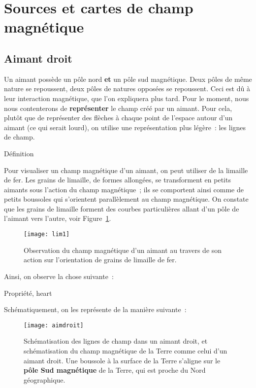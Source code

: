 \documentclass[../main/main.tex]{subfiles}
\begin{document}
\section{Sources et cartes de champ magnétique}
\subsection{Aimant droit}
\label{ssec:aimdroit}
Un aimant possède un pôle nord \textbf{et} un pôle sud magnétique. Deux pôles de
même nature se repoussent, deux pôles de natures opposées se repoussent. Ceci
est dû à leur interaction magnétique, que l'on expliquera plus tard. Pour le
moment, nous nous contenterons de \textbf{représenter} le champ créé par un
aimant. Pour cela, plutôt que de représenter des flèches à chaque point de
l'espace autour d'un aimant (ce qui serait lourd), on utilise une représentation
plus légère~: les lignes de champ.
\begin{tdefi}{Définition}
\end{tdefi}

Pour visualiser un champ magnétique d'un aimant, on peut utiliser de la limaille
de fer. Les grains de limaille, de formes allongées, se transforment en petits
aimants sous l'action du champ magnétique~; ils se comportent ainsi comme de
petits boussoles qui s'orientent parallèlement au champ magnétique. On constate
que les grains de limaille forment des courbes particulières allant d'un pôle de
l'aimant vers l'autre, voir Figure~\ref{fig:lim1}.
\begin{figure}[h]
  \centering
  \texttt{[image: lim1]}
  \caption{Observation du champ magnétique d'un aimant au travers de son action
  sur l'orientation de grains de limaille de fer.}
  \label{fig:lim1}
\end{figure}
Ainsi, on observe la chose suivante~:
\begin{tprop}{Propriété, heart}
\end{tprop}
Schématiquement, on les représente de la manière suivante~:

\begin{figure}[h]
  \centering
  \texttt{[image: aimdroit]}
  \caption{Schématisation des lignes de champ dans un aimant droit, et
  schématisation du champ magnétique de la Terre comme celui d'un aimant droit.
Une boussole à la surface de la Terre s'aligne sur le \textbf{pôle Sud magnétique}
de la Terre, qui est proche du Nord géographique.}
  \label{fig:aimdroitterre}
\end{figure}
\end{document}
